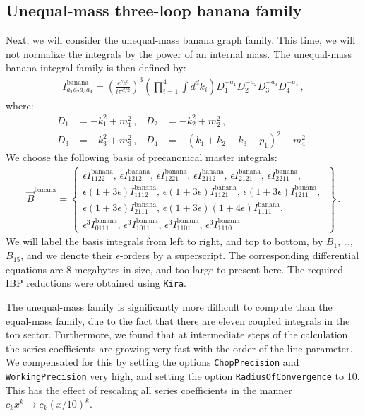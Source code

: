 \documentclass{article}
\begin{document}
\subsection{Unequal-mass three-loop banana family}
\label{sec:fourmassunequalbanana}
Next, we will consider the unequal-mass banana graph family. This time, we will not normalize the integrals by the power of an internal mass. The unequal-mass banana integral family is then defined by:
\begin{align}
    \label{eq:bananauneqdefinition}
    I^{\text{banana}}_{a_1a_2a_3a_4} = \left(\frac{ e^{\gamma_E \epsilon}}{i \pi^{d/2}} \right)^3 \left(\prod_{i=1}^4 \int d^dk_i\right) D_1^{-a_1} D_2^{-a_2} D_3^{-a_3} D_4^{-a_4}\,,
\end{align}
where:
\begin{align}
    D_1 &= -k_1^2 + m_1^2\,, & D_2 &= -k_2^2 + m_2^2\,,\nonumber\\ 
    D_3 &= -k_3^2 + m_3^2\,, & D_4 &= -(k_1+k_2+k_3+p_1)^2 + m_4^2\,.
\end{align}
We choose the following basis of precanonical master integrals:
\begin{align}
    \vec{B}^\text{banana} = \left\{\begin{array}{l}
        \epsilon I_{1122}^\text{banana},\, \epsilon I_{1212}^\text{banana},\, \epsilon I_{1221}^\text{banana},\, \epsilon I_{2112}^\text{banana},\, 
        \epsilon I_{2121}^\text{banana},\, \epsilon I_{2211}^\text{banana},\, \\ \epsilon(1+3\epsilon)I_{1112}^\text{banana},\, \epsilon(1+3\epsilon)I_{1121}^\text{banana},\,
        \epsilon(1+3\epsilon)I_{1211}^\text{banana},\, \\ \epsilon(1+3\epsilon)I_{2111}^\text{banana},\, \epsilon(1+3\epsilon)(1+4\epsilon)I_{1111}^\text{banana},\, \\
        \epsilon^3 I_{0111}^\text{banana},\,
        \epsilon^3 I_{1011}^\text{banana},\,
        \epsilon^3 I_{1101}^\text{banana},\,
        \epsilon^3 I_{1110}^\text{banana}
    \end{array}\right\}\,.
\end{align}
We will label the basis integrals from left to right, and top to bottom, by $B_1$, \ldots, $B_{15}$, and we denote their $\epsilon$-orders by a superscript. The corresponding differential equations are 8 megabytes in size, and too large to present here. The required IBP reductions were obtained using \texttt{Kira}.

The unequal-mass family is significantly more difficult to compute than the equal-mass family, due to the fact that there are eleven coupled integrals in the top sector. Furthermore, we found that at intermediate steps of the calculation the series coefficients are growing very fast with the order of the line parameter. We compensated for this by setting the options \texttt{ChopPrecision} and \texttt{WorkingPrecision} very high, and setting the option \texttt{RadiusOfConvergence} to 10. This has the effect of rescaling all series coefficients in the manner $c_k x^k \rightarrow c_k (x/10)^k$. 
\end{document}
